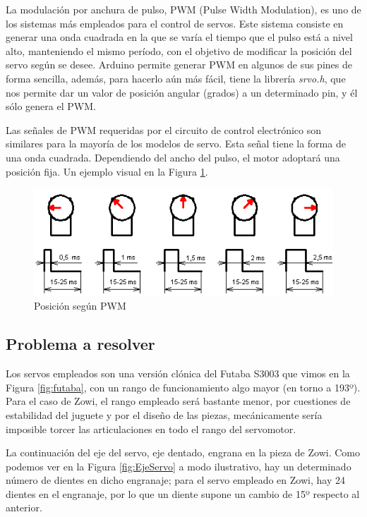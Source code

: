 La modulación por anchura de pulso, PWM (Pulse Width Modulation), es uno de los sistemas más empleados para el control de servos. Este sistema consiste en generar una onda cuadrada en la que se varía el tiempo que el pulso está a nivel alto, manteniendo el mismo período, con el objetivo de modificar la posición del servo según se desee. Arduino permite generar PWM en algunos de sus pines de forma sencilla, además, para hacerlo aún más fácil, tiene la librería \textit{srvo.h}, que nos permite dar un valor de posición angular (grados) a un determinado pin, y él sólo genera el PWM.

Las señales de PWM requeridas por el circuito de control electrónico son similares para la mayoría de los modelos de servo. Esta señal tiene la forma de una onda cuadrada. Dependiendo del ancho del pulso, el motor adoptará una posición fija. Un ejemplo visual en la Figura \ref{fig:ServoPWM}.

\begin{figure}[h]
\centering
\includegraphics[width=140mm]{Figures/servo-pwm.png}
\caption[Posición según PWM]{Posición según PWM}
\label{fig:ServoPWM}
\end{figure}

\subsection{Problema a resolver}
Los servos empleados son una versión clónica del Futaba S3003 que vimos en la Figura \ref{fig:futaba}, con un rango de funcionamiento algo mayor (en torno a 193º). Para el caso de Zowi, el rango empleado será bastante menor, por cuestiones de estabilidad del juguete y por el diseño de las piezas, mecánicamente sería imposible torcer las articulaciones en todo el rango del servomotor.

La continuación del eje del servo, eje dentado, engrana en la pieza de Zowi. Como podemos ver en la Figura \ref{fig:EjeServo} a modo ilustrativo, hay un determinado número de dientes en dicho engranaje; para el servo empleado en Zowi, hay 24 dientes en el engranaje, por lo que un diente supone un cambio de 15º respecto al anterior.

